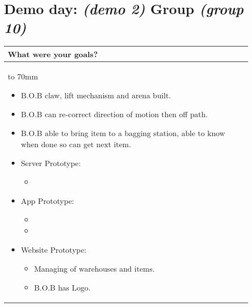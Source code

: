 \documentclass[a4paper]{article}
\newcommand{\colWidth}{141mm}
\begin{document}
 
\section*{Demo day: \textit{(demo 2)} Group \textit{(group 10)}}


\begin{center}
\begin{tabular}{|p{\colWidth}|}
	\hline
	\cellcolor{blue!25}\large
	\textbf{What were your goals?}
	\\ \hline
	\vtop to 70mm{
\begin{itemize}
    \item B.O.B claw, lift mechanism and arena built. 
    \item B.O.B can re-correct direction of motion then off path.
    \item B.O.B able to bring item to a bagging station, able to know when done so can get next item.
    \item Server Prototype: 
    \begin{itemize}
        \item 
    \end{itemize}
    \item App Prototype:
    \begin{itemize}
        \item 
        \item 
    \end{itemize}
    \item Website Prototype: 
    \begin{itemize}
        \item Managing of warehouses and items.
        \item B.O.B has Logo. 
    \end{itemize}
\end{itemize}
  }
  \\
  \hline
\end{tabular}
\vskip 5mm



\end{center}
\end{document}
